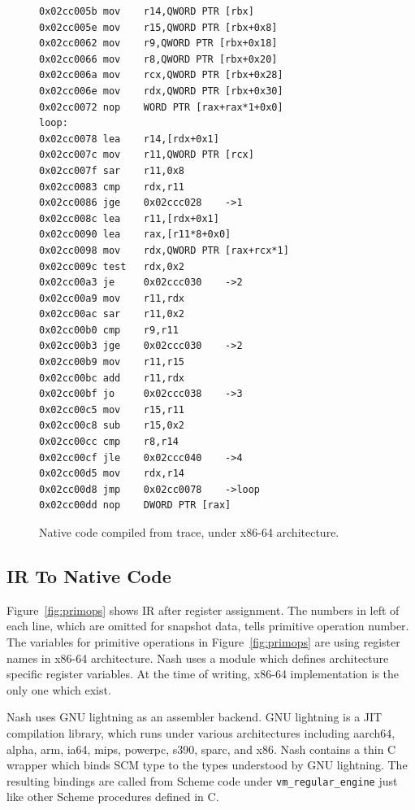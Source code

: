 \documentclass[preprint, 10pt]{sigplanconf}
\begin{document}
\begin{figure}
  \centering
  \small
\begin{verbatim}
0x02cc005b mov    r14,QWORD PTR [rbx]
0x02cc005e mov    r15,QWORD PTR [rbx+0x8]
0x02cc0062 mov    r9,QWORD PTR [rbx+0x18]
0x02cc0066 mov    r8,QWORD PTR [rbx+0x20]
0x02cc006a mov    rcx,QWORD PTR [rbx+0x28]
0x02cc006e mov    rdx,QWORD PTR [rbx+0x30]
0x02cc0072 nop    WORD PTR [rax+rax*1+0x0]
loop:
0x02cc0078 lea    r14,[rdx+0x1]
0x02cc007c mov    r11,QWORD PTR [rcx]
0x02cc007f sar    r11,0x8
0x02cc0083 cmp    rdx,r11
0x02cc0086 jge    0x02ccc028    ->1
0x02cc008c lea    r11,[rdx+0x1]
0x02cc0090 lea    rax,[r11*8+0x0]
0x02cc0098 mov    rdx,QWORD PTR [rax+rcx*1]
0x02cc009c test   rdx,0x2
0x02cc00a3 je     0x02ccc030    ->2
0x02cc00a9 mov    r11,rdx
0x02cc00ac sar    r11,0x2
0x02cc00b0 cmp    r9,r11
0x02cc00b3 jge    0x02ccc030    ->2
0x02cc00b9 mov    r11,r15
0x02cc00bc add    r11,rdx
0x02cc00bf jo     0x02ccc038    ->3
0x02cc00c5 mov    r15,r11
0x02cc00c8 sub    r15,0x2
0x02cc00cc cmp    r8,r14
0x02cc00cf jle    0x02ccc040    ->4
0x02cc00d5 mov    rdx,r14
0x02cc00d8 jmp    0x02cc0078    ->loop
0x02cc00dd nop    DWORD PTR [rax]
\end{verbatim}
\caption{Native code compiled from trace, under x86-64 architecture.}
\label{fig:ncode}
\end{figure}

\subsection{IR To Native Code}
Figure~\hyperref[fig:primops]{\ref{fig:primops}} shows IR after register
assignment. The numbers in left of each line, which are omitted for snapshot
data, tells primitive operation number. The variables for primitive operations
in Figure~\hyperref[fig:primops]{\ref{fig:primops}} are using register names in
x86-64 architecture. Nash uses a module which defines architecture specific
register variables. At the time of writing, x86-64 implementation is the only
one which exist.

Nash uses GNU lightning as an assembler backend\cite{}. GNU lightning is a JIT
compilation library, which runs under various architectures including aarch64,
alpha, arm, ia64, mips, powerpc, s390, sparc, and x86. Nash contains a thin C
wrapper which binds SCM type to the types understood by GNU lightning. The
resulting bindings are called from Scheme code under
\texttt{vm\_regular\_engine} just like other Scheme procedures defined in
C.
\end{document}
